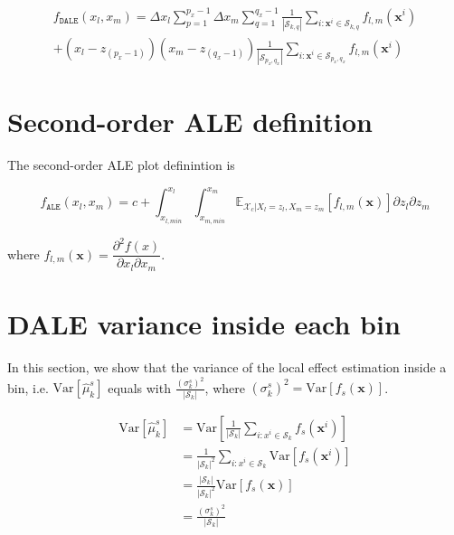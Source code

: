 \documentclass[wcp]{jmlr}
\newcommand{\Xc}{\mathcal{X}_c}
\newcommand{\xb}{\mathbf{x}}
\begin{document}
\begin{multline}
  f_{\mathtt{DALE}}(x_l, x_m) = \Delta x_l\sum_{p=1}^{p_x-1} \Delta x_m\sum_{q=1}^{q_x-1} \frac{1}{|\mathcal{S}_{k,q}|} \sum_{i:\xb^i \in \mathcal{S}_{k,q}}f_{l,m}(\xb^i)\\
  + (x_l-z_{(p_x-1)})(x_m-z_{(q_x-1)}) \frac{1}{|\mathcal{S}_{p_x,q_x}|} \sum_{i:\xb^i \in \mathcal{S}_{p_x,q_x}}f_{l,m}(\xb^i)
 \label{eq:DALE_second_order_complete}
\end{multline}

\section{Second-order ALE definition}

The second-order ALE plot definintion is

\begin{equation}
  f_{\mathtt{ALE}}(x_l, x_m) = c + \int_{x_{l, min}}^{x_l} \int_{x_{m, min}}^{x_m} \mathbb{E}_{\Xc|X_l=z_l,
      X_m=z_m}[f_{l,m}(\xb)] \partial z_l \partial z_m
  \label{eq:ALE2}
\end{equation}

\noindent

where
\( f_{l,m}(\xb) = \dfrac{\partial^2f(x)}{\partial x_l \partial x_m} \).

\section{DALE variance inside each bin}

In this section, we show that the variance of the local effect
estimation inside a bin, i.e. \(\mathrm{Var}[\hat{\mu}_k^s]\) equals
with \(\frac{(\sigma_k^s)^2}{|\mathcal{S}_k|}\), where
\((\sigma_k^s)^2 = \mathrm{Var}[f_s(\mathbf{x})]\).

\begin{equation}
  \begin{split}
  \mathrm{Var}[\hat{\mu}_k^s] &= \mathrm{Var} [\frac{1}{|\mathcal{S}_k|} \sum_{i: x^i\in \mathcal{S}_k} f_s(\xb^i)] \\
                              &= \frac{1}{|\mathcal{S}_k|^2} \sum_{i: x^i\in \mathcal{S}_k} \mathrm{Var}[f_s(\xb^i)] \\
                              &= \frac{|\mathcal{S}_k|}{|\mathcal{S}_k|^2} \mathrm{Var}[f_s(\xb)] \\
  &= \frac{(\sigma_k^s)^2}{|\mathcal{S}_k|}  \\
  \end{split}
\end{equation}
\end{document}
